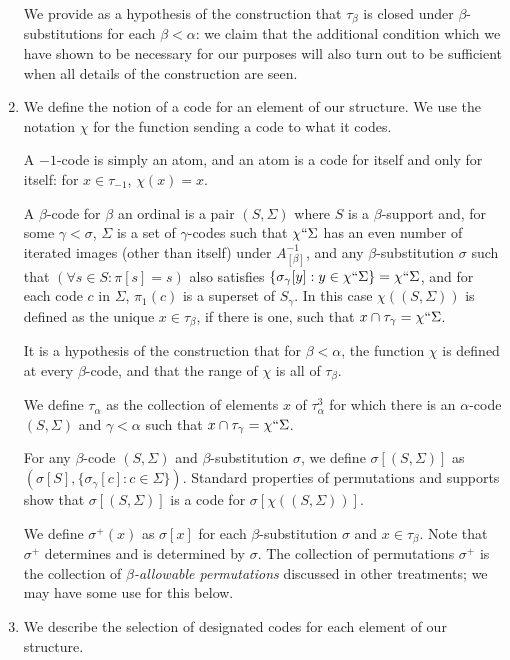 \documentclass[12pt]{article}
\begin{document}
\begin{enumerate}
We provide as a hypothesis of the construction that $\tau_\beta$ is closed under $\beta$-substitutions for each $\beta<\alpha$:  we claim that the additional condition which we have shown to be necessary for our purposes will also turn out to be sufficient when all details of the construction are seen.

\item We define the notion of a code for an element of our structure.  We use the notation $\chi$ for the function sending a code to what it codes.

A $-1$-code is simply an atom, and an atom is a code for itself and only for itself:  for $x \in \tau_{-1}$, $\chi(x)=x$.

A  $\beta$-code for $\beta$ an ordinal is a pair $(S,\Sigma)$ where $S$ is a $\beta$-support and, for some $\gamma<\sigma$, $\Sigma$ is a set of $\gamma$-codes such that $\chi``\Sigma$ has an even number of iterated images (other than itself) under $A_{[\beta]}^{-1}$, and any $\beta$-substitution $\sigma$ such that $(\forall s \in S:\pi[s]=s)$ also
satisfies $\{\sigma_\gamma[y]:y \in \chi``\Sigma\} = \chi``\Sigma$, and for each code $c$ in $\Sigma$, $\pi_1(c)$ is a superset of $S_\gamma$.  In this case $\chi((S,\Sigma))$ is defined as the unique $x\in \tau_\beta$, if there is one, such that $x \cap \tau_\gamma = \chi``\Sigma$.

It is a hypothesis of the construction that for $\beta<\alpha$, the function $\chi$ is defined at every $\beta$-code, and that the range of $\chi$ is all of $\tau_\beta$.

We define $\tau_\alpha$ as the collection of elements $x$ of $\tau^3_\alpha$ for which there is an $\alpha$-code $(S,\Sigma)$ and $\gamma<\alpha$ such that $x \cap \tau_\gamma = \chi``\Sigma$.

For any $\beta$-code $(S,\Sigma)$ and $\beta$-substitution $\sigma$, we define $\sigma[(S,\Sigma)]$ as $(\sigma[S],\{\sigma_\gamma[c]:c \in \Sigma\})$.  Standard properties of permutations and supports show that $\sigma[(S,\Sigma)]$ is a code for $\sigma[\chi((S,\Sigma))]$.

We define $\sigma^+(x)$ as $\sigma[x]$ for each $\beta$-substitution $\sigma$ and $x \in \tau_\beta$.  Note that $\sigma^+$ determines and is determined by $\sigma$.  The collection of permutations $\sigma^+$  is the collection of {\em $\beta$-allowable permutations\/} discussed in other treatments;
we may have some use for this below.


\item We describe the selection of designated codes for each element of our structure.


\end{enumerate}
\end{document}
